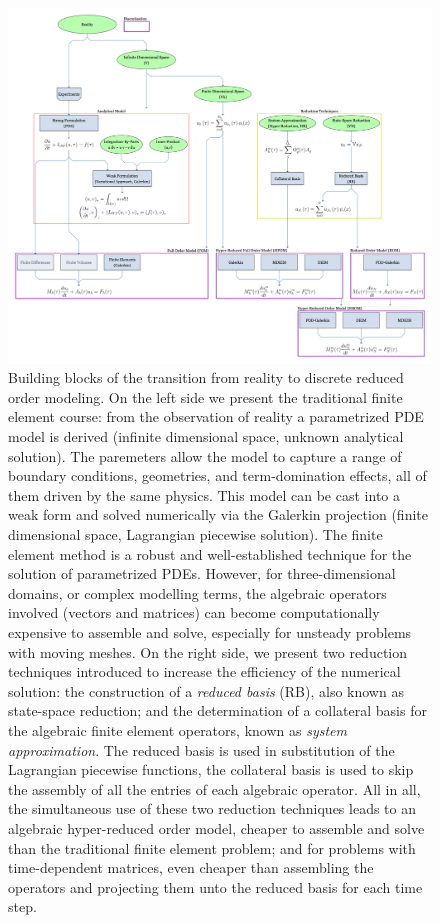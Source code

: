 \onecolumn
\begin{figure}[h]
   \includegraphics[width=\columnwidth]{graphs/From-Reality-To-ROM.png}
   \caption{Building blocks of the transition from reality to discrete 
   reduced order modeling.
   On the left side we present the traditional finite element course: 
   from the observation of reality a parametrized PDE model is derived 
   (infinite dimensional space, unknown analytical solution).
   The paremeters allow the model to capture a range of 
   boundary conditions, geometries,
   and term-domination effects, 
   all of them driven by the same physics.
   This model can be cast into a weak form and 
   solved numerically via the Galerkin projection 
   (finite dimensional space, Lagrangian piecewise solution).
   The finite element method is a robust and well-established technique
   for the solution of parametrized PDEs.
   However, for three-dimensional domains, 
   or complex modelling terms, the algebraic operators involved (vectors and matrices) 
   can become computationally expensive to assemble and solve,
   especially for unsteady problems with moving meshes.
   On the right side, we present two reduction techniques introduced 
   to increase the efficiency of the numerical solution:
   the construction of a \textit{reduced basis} (RB), also known as state-space reduction;
   and the determination of a collateral basis for 
   the algebraic finite element operators, known as \textit{system approximation}.
   The reduced basis is used in substitution of the Lagrangian piecewise functions,
   the collateral basis is used to skip the assembly 
   of all the entries of each algebraic operator.
   All in all, the simultaneous use of these two reduction techniques 
   leads to an algebraic hyper-reduced order model,
   cheaper to assemble and solve than the traditional finite element problem;
   and for problems with time-dependent matrices,
   even cheaper than assembling the operators and projecting them
   unto the reduced basis for each time step.}
   \label{fig:overview_graph}
 \end{figure}
 \twocolumn